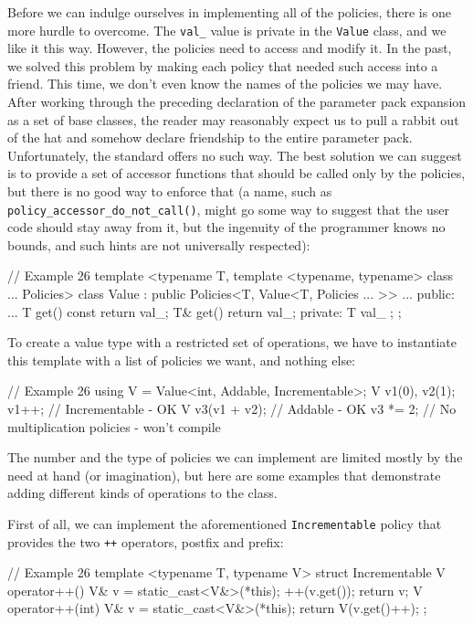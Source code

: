 Before we can indulge ourselves in implementing all of the policies, there is one more hurdle to overcome. The \texttt{val\_} value is private in the \texttt{Value} class, and we like it this way. However, the policies need to access and modify it. In the past, we solved this problem by making each policy that needed such access into a friend. This time, we don't even know the names of the policies we may have. After working through the preceding declaration of the parameter pack expansion as a set of base classes, the reader may reasonably expect us to pull a rabbit out of the hat and somehow declare friendship to the entire parameter pack. Unfortunately, the standard offers no such way. The best solution we can suggest is to provide a set of accessor functions that should be called only by the policies, but there is no good way to enforce that (a name, such as \texttt{policy\_accessor\_do\_not\_call()}, might go some way to suggest that the user code should stay away from it, but the ingenuity of the programmer knows no bounds, and such hints are not universally respected):

\begin{code}
// Example 26
template <typename T,
          template <typename, typename> class ... Policies>
class Value :
  public Policies<T, Value<T, Policies ... >> ...
{
  public:
  ...
  T get() const { return val_; }
  T& get() { return val_; }
  private:
  T val_ {};
};
\end{code}

To create a value type with a restricted set of operations, we have to instantiate this template with a list of policies we want, and nothing else:

\begin{code}
// Example 26
using V = Value<int, Addable, Incrementable>;
V v1(0), v2(1);
v1++; // Incrementable - OK
V v3(v1 + v2); // Addable - OK
v3 *= 2; // No multiplication policies - won't compile
\end{code}

The number and the type of policies we can implement are limited mostly by the need at hand (or imagination), but here are some examples that demonstrate adding different kinds of operations to the class.

First of all, we can implement the aforementioned \texttt{Incrementable} policy that provides the two \texttt{++} operators, postfix and prefix:

\begin{code}
// Example 26
template <typename T, typename V> struct Incrementable {
  V operator++() {
    V& v = static_cast<V&>(*this);
    ++(v.get());
    return v;
  }
  V operator++(int) {
    V& v = static_cast<V&>(*this);
    return V(v.get()++);
  }
};
\end{code}

